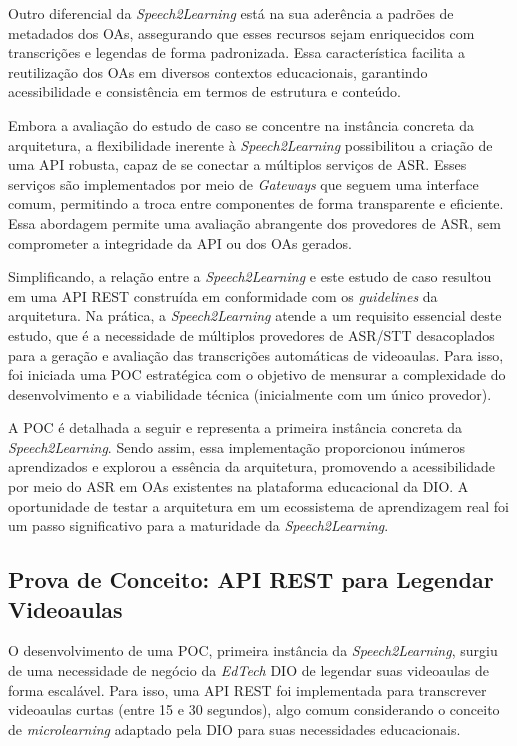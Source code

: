 Outro diferencial da \textit{Speech2Learning} está na sua aderência a padrões de metadados dos OAs, assegurando que esses recursos sejam enriquecidos com transcrições e legendas de forma padronizada. Essa característica facilita a reutilização dos OAs em diversos contextos educacionais, garantindo acessibilidade e consistência em termos de estrutura e conteúdo.

Embora a avaliação do estudo de caso se concentre na instância concreta da arquitetura, a flexibilidade inerente à \textit{Speech2Learning} possibilitou a criação de uma API robusta, capaz de se conectar a múltiplos serviços de ASR. Esses serviços são implementados por meio de \textit{Gateways} que seguem uma interface comum, permitindo a troca entre componentes de forma transparente e eficiente. Essa abordagem permite uma avaliação abrangente dos provedores de ASR, sem comprometer a integridade da API ou dos OAs gerados.

Simplificando, a relação entre a \textit{Speech2Learning} e este estudo de caso resultou em uma API REST construída em conformidade com os \textit{guidelines} da arquitetura. Na prática, a \textit{Speech2Learning} atende a um requisito essencial deste estudo, que é a necessidade de múltiplos provedores de ASR/STT desacoplados para a geração e avaliação das transcrições automáticas de videoaulas. Para isso, foi iniciada uma POC estratégica com o objetivo de mensurar a complexidade do desenvolvimento e a viabilidade técnica (inicialmente com um único provedor).

A POC é detalhada a seguir e representa a primeira instância concreta da \textit{Speech2Learning}. Sendo assim, essa implementação proporcionou inúmeros aprendizados e explorou a essência da arquitetura, promovendo a acessibilidade por meio do ASR em OAs existentes na plataforma educacional da DIO. A oportunidade de testar a arquitetura em um ecossistema de aprendizagem real foi um passo significativo para a maturidade da \textit{Speech2Learning}.

\subsection{Prova de Conceito: API REST para Legendar Videoaulas}

O desenvolvimento de uma POC, primeira instância da \textit{Speech2Learning}, surgiu de uma necessidade de negócio da \textit{EdTech} DIO de legendar suas videoaulas de forma escalável. Para isso, uma API REST foi implementada para transcrever videoaulas curtas (entre 15 e 30 segundos), algo comum considerando o conceito de \textit{microlearning} adaptado pela DIO para suas necessidades educacionais. 

